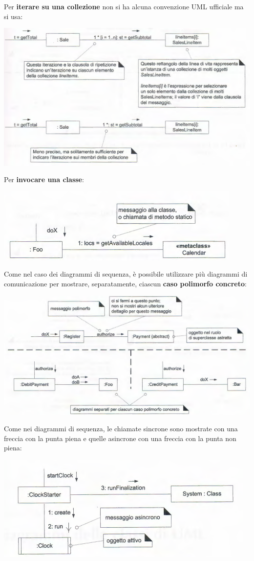 \documentclass[a4paper,12pt, oneside]{book}
\begin{document}
Per \textbf{iterare su una collezione} non si ha alcuna convenzione UML ufficiale ma si usa:
\begin{center}
	\includegraphics[scale=0.6]{img/umd9.png}
\end{center}
Per \textbf{invocare una classe}:
\begin{center}
	\includegraphics[scale=0.7]{img/comd9.png}
\end{center}
Come nel caso dei diagrammi di sequenza, è possibile
utilizzare più diagrammi di comunicazione per mostrare, separatamente, ciascun \textbf{caso polimorfo concreto}:
\begin{center}
	\includegraphics[scale=0.7]{img/comd10.png}
\end{center}
Come nei diagrammi di sequenza, le chiamate sincrone sono mostrate con una freccia con 
la punta piena e quelle asincrone con una freccia con la punta non piena:
\begin{center}
	\includegraphics[scale=0.7]{img/comd11.png}
\end{center}
\end{document}

